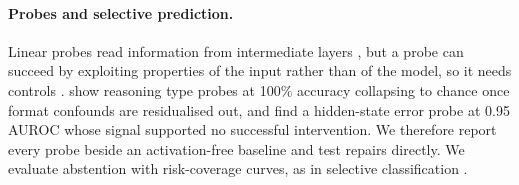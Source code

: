 \paragraph{Probes and selective prediction.} Linear probes read information
from intermediate layers \citep{alain2016probes}, but a probe can succeed by
exploiting properties of the input rather than of the model, so it needs
controls \citep{hewitt2019control}. \citet{sahoo2026linearprobes} show reasoning
type probes at 100\% accuracy collapsing to chance once format confounds are
residualised out, and \citet{yuan2026hiddenerror} find a hidden-state error
probe at 0.95 AUROC whose signal supported no successful intervention. We
therefore report every probe beside an activation-free baseline and test
repairs directly. We evaluate abstention with risk-coverage curves, as in
selective classification \citep{geifman2017selective}.
